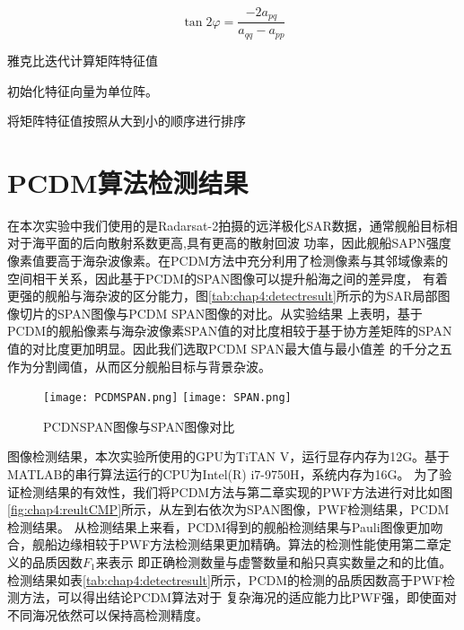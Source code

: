        \begin{equation}
           \label{equ:chap4:rotationangle}
           \tan 2\varphi  = \frac{{ - 2{a_{pq}}}}{{{a_{qq}} - {a_{pp}}}}
       \end{equation}

    \begin{algorithm}[htb]
      \caption{雅克比迭代计算矩阵特征值}
      \label{alg:chap4:jacobianeigen}
      \BlankLine
      初始化特征向量为单位阵。


      将矩阵特征值按照从大到小的顺序进行排序
    \end{algorithm}

\section{PCDM算法检测结果}
    在本次实验中我们使用的是Radarsat-2拍摄的远洋极化SAR数据，通常舰船目标相对于海平面的后向散射系数更高,具有更高的散射回波
    功率，因此舰船SAPN强度像素值要高于海杂波像素。在PCDM方法中充分利用了检测像素与其邻域像素的空间相干关系，因此基于PCDM的SPAN图像可以提升船海之间的差异度，
    有着更强的舰船与海杂波的区分能力，图\ref{tab:chap4:detectresult}所示的为SAR局部图像切片的SPAN图像与PCDM SPAN图像的对比。从实验结果
    上表明，基于PCDM的舰船像素与海杂波像素SPAN值的对比度相较于基于协方差矩阵的SPAN值的对比度更加明显。因此我们选取PCDM SPAN最大值与最小值差
    的千分之五作为分割阈值，从而区分舰船目标与背景杂波。

  \begin{figure}[h]
    \centering
        {\texttt{[image: PCDMSPAN.png]}}
        {\texttt{[image: SPAN.png]}}
    \caption{PCDNSPAN图像与SPAN图像对比}
    \label{fig:chap4:SPANCMP}
  \end{figure}

  图像检测结果，本次实验所使用的GPU为TiTAN V，运行显存内存为12G。基于MATLAB的串行算法运行的CPU为Intel(R) i7-9750H，系统内存为16G。
  为了验证检测结果的有效性，我们将PCDM方法与第二章实现的PWF方法进行对比如图\ref{fig:chap4:reultCMP}所示，从左到右依次为SPAN图像，PWF检测结果，PCDM检测结果。
  从检测结果上来看，PCDM得到的舰船检测结果与Pauli图像更加吻合，舰船边缘相较于PWF方法检测结果更加精确。算法的检测性能使用第二章定义的品质因数$F_1$来表示
  即正确检测数量与虚警数量和船只真实数量之和的比值。检测结果如表\ref{tab:chap4:detectresult}所示，PCDM的检测的品质因数高于PWF检测方法，可以得出结论PCDM算法对于
  复杂海况的适应能力比PWF强，即使面对不同海况依然可以保持高检测精度。

